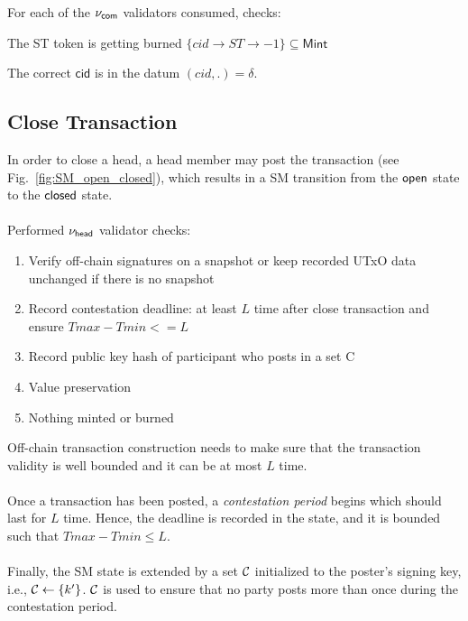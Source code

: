 \noindent For each of the $\nu_\mathsf{com}$ validators consumed, checks:
\begin{menumerate}
  \item The ST token is getting burned $\{cid \rightarrow ST \rightarrow -1\} \subseteq \mathsf{Mint}$
  \item The correct $\mathsf{cid}$ is in the datum $(cid,.) = \delta$.
\end{menumerate}

\subsection{Close Transaction} 

In order to close a head, a head
member may post the \mtxClose{} transaction (see
Fig.~\ref{fig:SM_open_closed}), which results in a SM transition
from the $\mathsf{open}$ state to the $\mathsf{closed}$ state.
\\
\\
Performed $\nu_\mathsf{head}$ validator checks:

\begin{enumerate}
  \item Verify off-chain signatures on a snapshot or keep recorded UTxO data unchanged if there is no snapshot 
  \item Record contestation deadline: at least $L$ time after close transaction and ensure $Tmax - Tmin <= L$ 
  \item Record public key hash of participant who posts in a set C
  \item Value preservation
  \item Nothing minted or burned
\end{enumerate}

\noindent Off-chain transaction construction needs to make sure that the transaction validity is well bounded and it can be at most $L$ time.
\\
\\
Once a \mtxClose{} transaction has been posted, a \emph{contestation period}
begins which should last for $L$ time. Hence, the deadline is recorded in the state, and it is bounded such that $Tmax - Tmin \leq L$.
\\
\\
Finally, the SM state is extended by a set $\mathcal C$
initialized to the poster's signing key, i.e.,
$\mathcal C \gets \{k'\}$.   $\mathcal C$ is used to ensure that no party
posts more than once during the contestation period.





